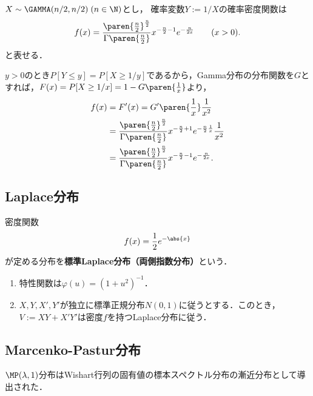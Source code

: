 \documentclass[uplatex,dvipdfmx]{jsreport}
\begin{document}
\begin{proposition}[逆Gamma分布の密度関数]\label{prop-density-of-inverse-Gamma-distribution}
    $X\sim\GAMMA(n/2,n/2)\;(n\in\N)$とし，
    確率変数$Y:=1/X$の確率密度関数は
    \[f(x)=\frac{\paren{\frac{n}{2}}^{\frac{n}{2}}}{\Gamma\paren{\frac{n}{2}}}x^{-\frac{n}{2}-1}e^{-\frac{n}{2x}}\qquad(x>0).\]
    と表せる．
\end{proposition}
\begin{Proof}
    $y>0$のとき$P[Y\le y]=P[X\ge 1/y]$であるから，Gamma分布の分布関数を$G$とすれば，$F(x)=P[X\ge 1/x]=1-G\paren{\frac{1}{x}}$より，
    \begin{align*}
        f(x)&=F'(x)=G'\paren{\frac{1}{x}}\frac{1}{x^2}\\
        &=\frac{\paren{\frac{n}{2}}^{\frac{n}{2}}}{\Gamma\paren{\frac{n}{2}}}x^{-\frac{n}{2}+1}e^{-\frac{n}{2}\frac{1}{x}}\frac{1}{x^2}\\
        &=\frac{\paren{\frac{n}{2}}^{\frac{n}{2}}}{\Gamma\paren{\frac{n}{2}}}x^{-\frac{n}{2}-1}e^{-\frac{n}{2x}}.
    \end{align*}
\end{Proof}

\subsection{Laplace分布}

\begin{definition}
    密度関数
    \[f(x)=\frac{1}{2}e^{-\abs{x}}\]
    が定める分布を\textbf{標準Laplace分布（両側指数分布）}という．
\end{definition}

\begin{proposition}\mbox{}
    \begin{enumerate}
        \item 特性関数は$\varphi(u)=(1+u^2)^{-1}$．
        \item $X,Y,X',Y'$が独立に標準正規分布$N(0,1)$に従うとする．このとき，$V:=XY+X'Y'$は密度$f$を持つLaplace分布に従う．
    \end{enumerate}
\end{proposition}

\subsection{Marcenko-Pastur分布}

\begin{tcolorbox}[colframe=ForestGreen, colback=ForestGreen!10!white,breakable,colbacktitle=ForestGreen!40!white,coltitle=black,fonttitle=\bfseries\sffamily,
title=]
    $\MP(\lambda,1)$分布はWishart行列の固有値の標本スペクトル分布の漸近分布として導出された．
\end{tcolorbox}
\end{document}

